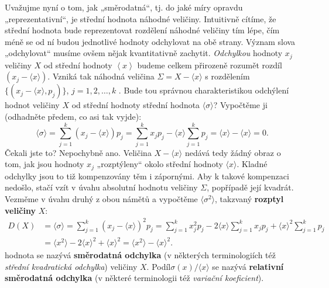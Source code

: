     Uvažujme nyní o tom, jak „směrodatná“, tj. do jaké míry opravdu „reprezentativní“, je
    střední hodnota náhodné veličiny. Intuitivně cítíme, že střední hodnota bude reprezentovat
    rozdělení náhodné veličiny tím lépe, čím méně se od ní budou jednotlivé hodnoty odchylovat na 
    obě strany. Význam slova „odchylovat“ musíme ovšem nějak kvantitativně zachytit.
    \emph{Odchylkou} hodnoty \(x_j\) veličiny \(X\) od střední hodnoty \(\left\langle x 
    \right\rangle\) budeme celkem přirozeně rozumět rozdíl \((x_j - \langle x\rangle)\). Vzniká tak 
    náhodná veličina \(\Sigma = X - \langle x \rangle\) s rozdělením \(\{(x_j - \langle x\rangle, 
    p_j)\}\), \(j = 1, 2, \ldots, k\) . Bude tou správnou charakteristikou odchýlení hodnot 
    veličiny \(X\) od střední hodnoty střední hodnota \(\langle\sigma\rangle\)? Vypočtěme ji 
    (odhadněte předem, co asi tak vyjde):
    \begin{equation*}
      \langle\sigma\rangle = \sum_{j=1}^{k}(x_j - \langle x\rangle)p_j
        = \sum_{j=1}^{k}x_jp_j - \langle x\rangle\sum_{j=1}^{k}p_j
        = \langle x\rangle - \langle x\rangle = 0.
    \end{equation*}
    Čekali jste to? Nepochybně ano. Veličina \(X - \langle x\rangle \) nedává tedy žádný obraz o 
    tom, jak jsou hodnoty \(x_j\) „rozptýleny“ okolo střední hodnoty \(\langle x\rangle\). Kladné 
    odchylky jsou to tiž kompenzovány těm i zápornými. Aby k takové kompenzaci nedošlo, stačí vzít 
    v úvahu absolutní hodnotu veličiny \(\Sigma\), popřípadě její kvadrát. Vezměme v úvahu druhý z 
    obou námětů a vypočtěme \(\langle \sigma^2\rangle\), takzvaný \textbf{rozptyl veličiny} \(X\):
    \begin{align}\label{mai:eq061}
      D(X) &= \langle \sigma\rangle = \sum_{j=1}^{k}(x_j - \langle x\rangle)^2p_j
            = \sum_{j=1}^{k}x_j^2p_j - 2\langle x\rangle\sum_{j=1}^{k}x_jp_j 
            + \langle x\rangle^2\sum_{j=1}^{k}p_j                                     \\
           &= \langle x^2\rangle - 2\langle x\rangle^2 + \langle x\rangle^2 
            = \langle x^2\rangle - \langle x\rangle^2.
    \end{align}
    hodnota
    se nazývá \textbf{směrodatná odchylka} (v některých terminologiích též \emph{střední 
    kvadratická odchylka}) veličiny \(X\). Podíl\(\sigma(x)/ \langle x\rangle\) se nazývá 
    \textbf{relativní směrodatná odchylka} (v některé terminologii též \emph{variační koeficient}).

